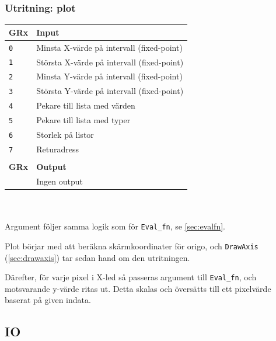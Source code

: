 \documentclass[]{article}
\begin{document}
\subsubsection{Utritning: plot}
\begin{tabular}{ll}
	\textbf{GRx} & \textbf{Input}               \\ \hline
	\texttt{0}   & Minsta X-värde på intervall (fixed-point)  \\
	\texttt{1}   & Största X-värde på intervall (fixed-point) \\
	\texttt{2}   & Minsta Y-värde på intervall (fixed-point)  \\
	\texttt{3}   & Största Y-värde på intervall (fixed-point) \\
	\texttt{4}   & Pekare till lista med värden \\
	\texttt{5}   & Pekare till lista med typer  \\
	\texttt{6}   & Storlek på listor            \\
	\texttt{7}   & Returadress                  \\
	             &  \\
	\textbf{GRx} & \textbf{Output}              \\ \hline
	             & Ingen output
\end{tabular}
\\\\
\noindent
Argument följer samma logik som för \texttt{Eval\_fn}, se \ref{sec:evalfn}.

Plot börjar med att beräkna skärmkoordinater för origo, och \texttt{DrawAxis} (\ref{sec:drawaxis}) tar sedan hand om den utritningen.

Därefter, för varje pixel i X-led så passeras argument till \texttt{Eval\_fn}, och motsvarande y-värde ritas ut. Detta skalas och översätts till ett pixelvärde baserat på given indata.

\subsection{IO}
\end{document}
